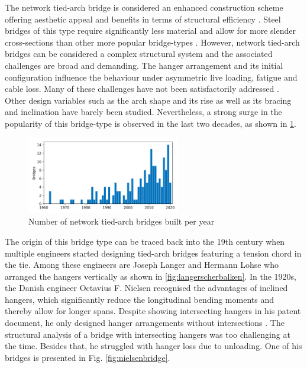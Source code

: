 The network tied-arch bridge is considered an enhanced construction scheme offering aesthetic appeal and benefits in terms of structural efficiency \cite{Hu}. Steel bridges of this type require significantly less material and allow for more slender cross-sections than other more popular bridge-types \cite{Herzog}. However, network tied-arch bridges can be considered a complex structural system and the associated challenges are broad and demanding. 
The hanger arrangement and its initial configuration influence the behaviour under asymmetric live loading, fatigue and cable loss. 
Many of these challenges have not been satisfactorily addressed \cite{Bruno_2}. Other design variables such as the arch shape and its rise as well as its bracing and inclination have barely been studied. Nevertheless, a strong surge in the popularity of this bridge-type is observed in the last two decades, as shown in \cref{fig:yearly_bridges}.

\begin{figure}[H]
    \centering
    \includegraphics[trim={0 2.2cm 0 1.8cm},clip, width=0.60\textwidth]{overleaf/Pictures/myplot.png}
    \caption{Number of network tied-arch bridges built per year \cite{Cavegn}}
    \label{fig:yearly_bridges}
\end{figure}

The origin of this bridge type can be traced back into the 19th century when multiple engineers started designing tied-arch bridges featuring a tension chord in the tie. Among these engineers are Joseph Langer and Hermann Lohse who arranged the hangers vertically as shown in \cref{fig:langerscherbalken}. In the 1920s, the Danish engineer Octavius F. Nielsen recognised the advantages of inclined hangers, which significantly reduce the longitudinal bending moments and thereby allow for longer spans. Despite showing intersecting hangers in his patent document, he only designed hanger arrangements without intersections \cite{Tveit_Bits}. The structural analysis of a bridge with intersecting hangers was too challenging at the time. Besides that, he struggled with hanger loss due to unloading. One of his bridges is presented in Fig. \ref{fig:nielsenbridge}.


